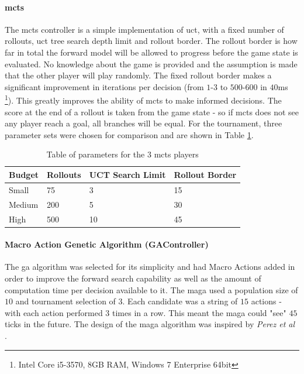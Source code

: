 \documentclass{IEEEtran}
\begin{document}
\paragraph{\gls{mcts}}
The \gls{mcts} controller is a simple implementation of \gls{uct}, with a fixed number of rollouts, \gls{uct} tree search depth limit and rollout border. The rollout border is how far in total the forward model will be allowed to progress before the game state is evaluated. No knowledge about the game is provided and the assumption is made that the other player will play randomly. The fixed rollout border makes a significant improvement in iterations per decision (from $1$-$3$ to $500$-$600$ in $40$ms \footnote{Intel Core i5-3570, 8GB RAM, Windows 7 Enterprise 64bit}). This greatly improves the ability of \gls{mcts} to make informed decisions. The score at the end of a rollout is taken from the game state - so if \gls{mcts} does not see any player reach a goal, all branches will be equal. For the tournament, three parameter sets were chosen for comparison and are shown in Table \ref{mctsTable}.
\begin{table}[!t]
\begin{center}
\begin{tabular}{|p{2.0cm}|p{2.0cm}|m{1.4cm}|m{1.4cm}|}
\hline
\textbf{Budget} & \textbf{Rollouts} & \textbf{UCT Search Limit} & \textbf{Rollout Border} \\
\hline
Small & 75 & 3 & 15 \\
Medium & 200 & 5 & 30 \\
High & 500 & 10 & 45 \\
\hline
\end{tabular}
\caption{Table of parameters for the 3 \gls{mcts} players}
\label{mctsTable}
\end{center}
\end{table}

\paragraph{Macro Action Genetic Algorithm (GAController)}
The \gls{ga} algorithm was selected for its simplicity and had Macro Actions added in order to improve the forward search capability as well as the amount of computation time per decision available to it. The \gls{maga} used a population size of $10$ and tournament selection of $3$. Each candidate was a string of $15$ actions - with each action performed $3$ times in a row. This meant the \gls{maga} could "see" $45$ ticks in the future. The design of the \gls{maga} algorithm was inspired by \textit{Perez et al} \cite{perez2013rolling}. 
\end{document}
